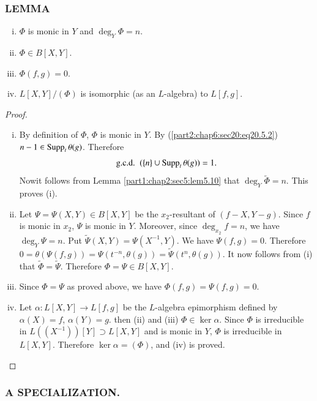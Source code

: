 \setcounter{mysubsection}{5}
\setcounter{subsubsection}{2}
\subsubsection{LEMMA}\label{part2:chap6:sec20:sss20.5.3}
\begin{enumerate}[(i)]
\item $\Phi$ is monic in $Y$ and $\deg_Y \Phi=n$.
  \item $\Phi \in B [X, Y]$.
    \item $\Phi (f, g)=0$.
      \item $L [X, Y]/(\Phi)$ is isomorphic (as an $L$-algebra) to
        $L[f, g]$.
\end{enumerate}

\begin{proof}
  ~
  \begin{enumerate}[(i)]
    \item By definition of $\Phi$, $\Phi$ is monic in $Y$. By
      (\ref{part2:chap6:sec20:eq20.5.2}) $n-1 \in \operatorname{Supp}_t \theta
      (g)$. Therefore
      $$
      \text{{g.c.d.}\kern.3em}~ ( \{ n\} \cup \operatorname{Supp}_t \theta (g))=1.
      $$
      Now\pageoriginale it follows from Lemma \ref{part1:chap2:sec5:lem5.10} that
     $\deg_Y \tilde{\Phi} =n$. This proves (i).
      \item Let $\Psi = \Psi (X, Y) \in B [X, Y]$ be the
        $x_2$-resultant of $(f- X, Y-g)$. Since $f$ is monic in $x_2$,
        $\Psi$ is monic in $Y$. Moreover, since $\deg_{x_2} f=n$, we
        have $\deg_Y \Psi =n$. Put $\tilde{\Psi} (X, Y)= \Psi (X^{-1},
        Y)$. We have $\Psi (f, g)=0$. Therefore $0 = \theta (\Psi (f,
        g))= \Psi (t^{-n} , \theta (g))= \tilde{\Psi} (t^n , \theta
        (g))$. It now follows from (i) that $\tilde{\Phi} =
        \tilde{\Psi}$. Therefore $\Phi = \Psi \in B [X, Y]$.
        \item Since $\Phi= \Psi$ as proved above, we have $\Phi (f,
          g)= \Psi (f, g)=0$.
          \item Let $\alpha: L [X, Y] \to L[f, g]$ be the $L$-algebra
            epimorphism defined by $\alpha(X) = f$,
            $\alpha(Y)=g$. then (ii) and (iii) $\Phi \in \ker
            \alpha$. Since $\Phi$ is irreducible in $L((X^{-1})) [Y] \supset
            L[X, Y]$ and is monic in $Y$, $\Phi$ is irreducible in $L[X,Y]$. Therefore $\ker \alpha = (\Phi)$, and (iv) is proved.
  \end{enumerate}
\end{proof}

\subsubsection{A SPECIALIZATION.} \label{part2:chap6:sec20:sss20.5.4}

